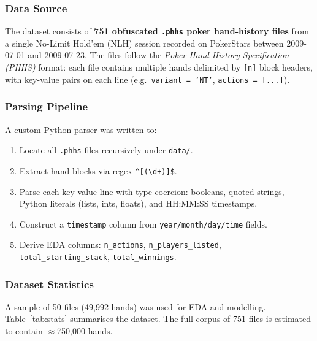 \documentclass{article}
\begin{document}
\subsubsection{Data Source}
The dataset consists of \textbf{751 obfuscated \texttt{.phhs} poker hand-history files}
from a single No-Limit Hold'em (NLH) session recorded on PokerStars between
2009-07-01 and 2009-07-23. The files follow the \emph{Poker Hand History Specification
(PHHS)} format: each file contains multiple hands delimited by \texttt{[n]} block headers,
with key-value pairs on each line (e.g.\ \texttt{variant = 'NT'}, \texttt{actions = [...]}).

\subsubsection{Parsing Pipeline}
A custom Python parser was written to:
\begin{enumerate}[noitemsep]
  \item Locate all \texttt{.phhs} files recursively under \texttt{data/}.
  \item Extract hand blocks via regex \texttt{\^{}[(\textbackslash d+)]\$}.
  \item Parse each key-value line with type coercion: booleans, quoted strings,
        Python literals (lists, ints, floats), and HH:MM:SS timestamps.
  \item Construct a \texttt{timestamp} column from \texttt{year/month/day/time} fields.
  \item Derive EDA columns: \texttt{n\_actions}, \texttt{n\_players\_listed},
        \texttt{total\_starting\_stack}, \texttt{total\_winnings}.
\end{enumerate}

\subsubsection{Dataset Statistics}
A sample of 50 files (49,992 hands) was used for EDA and modelling. Table~\ref{tab:stats}
summarises the dataset. The full corpus of 751 files is estimated to contain
$\approx$750,000 hands.
\end{document}
